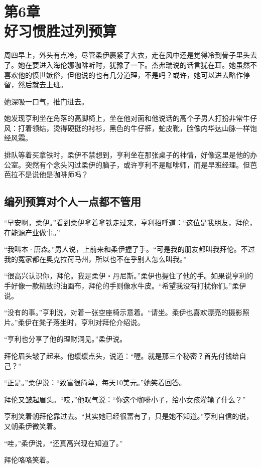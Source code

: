 \section[第6章\q 好习惯胜过列预算]{第6章\\ 好习惯胜过列预算}
\label{sec:ch6}

周四早上，外头有点冷，尽管柔伊裹紧了大衣，走在风中还是觉得冷到骨子里头去了。她在要进入海伦娜咖啡听时，犹豫了一下。杰弗瑞说的话言犹在耳。她虽然不喜欢他的愤世嫉俗，但他说的也有几分道理，不是吗？或许，她可以进去略作停留，然后就去上班。

她深吸一口气，推门进去。

她发现亨利坐在角落的高脚椅上，坐在他对面和他说话的高个子男人打扮非常牛仔风：打着领结，烫得硬挺的衬衫，黑色的牛仔裤，蛇皮靴，脸像内华达山脉一样饱经风霜。

排队等着买拿铁时，柔伊不禁想到，亨利坐在那张桌子的神情，好像这里是他的办公室。突然有个念头闪过柔伊的脑子，或许亨利不是咖啡师，而是早班经理。但芭芭拉不是说他是咖啡师吗？

\subsection{编列预算对个人一点都不管用}

“早安啊，柔伊。”看到柔伊拿着拿铁走过来，亨利招呼道：“这位是我朋友，拜伦，在能源产业做事。”

“我叫本·唐森。”男人说，上前来和柔伊握了手。“可是我的朋友都叫我拜伦。不过我的冤家都在奥克拉荷马州，所以也不在乎别人怎么叫我。”

“很高兴认识你，拜伦。我是柔伊‧丹尼斯。”柔伊也握住了他的手。如果说亨利的手好像一款精致的油画布，拜伦的手则像水牛皮。“希望我没有打扰你们。”柔伊说。

“没有的事。”亨利说，对着一张空座椅示意着。“请坐。柔伊也喜欢漂亮的摄影照片。”柔伊在凳子落坐时，亨利对拜伦介绍说。

“亨利也分享了他的理财洞见。”柔伊说。

拜伦眉头皱了起来。他缓缓点头，说道：“喔。就是那三个秘密？首先付钱给自己？”

“正是。”柔伊说：“致富很简单，每天10美元。”她笑着回答。

拜伦又皱起眉头。“哎，”他叹气说：“你这个咖啡小子，给小女孩灌输了什么？”

亨利笑着朝拜伦靠过去。“其实她已经很富有了，只是她不知道。”亨利自信的说，又朝柔伊微笑着。

“哇，”柔伊说，“还真高兴现在知道了。”

拜伦咯咯笑着。

